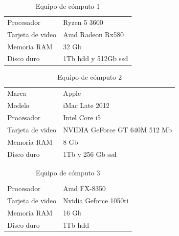 \documentclass[12pt, a4paper, titlepage]{report}
\begin{document}
        \begin{table}[H]
        	\caption[Equipo de cómputo 1]{Equipo de cómputo 1}
	    	\begin{tabular}{|p{3.5cm}||p{10cm}|}
	    		\rowcolor{guindapoli}
	    		\multicolumn{2}{|c|}{\textbf{\textcolor{white}{Equipo de cómputo 1 utilizado.}}}\\
	    		\hline
	    		\rowcolor{azulclaro}Procesador & Ryzen 5 3600\\
	    		\hline
	    		\rowcolor{white}Tarjeta de video & Amd Radeon Rx580\\
	    		\hline
	    		\rowcolor{azulclaro}Memoria RAM & 32 Gb\\
	    		\hline
	    		\rowcolor{white}Disco duro & 1Tb \acrshort{hdd} y 512Gb \acrshort{ssd}\\
	    		\hline
	    	\end{tabular}
   	  \end{table}
      \begin{table}[H]
      	\caption[Equipo de cómputo 2]{Equipo de cómputo 2}
	    	\begin{tabular}{|p{3.5cm}||p{10cm}|}
	    		\rowcolor{guindapoli}
	    		\multicolumn{2}{|c|}{\textbf{\textcolor{white}{Equipo de cómputo 2 utilizado.}}}\\
	    		\hline
	    		\rowcolor{azulclaro}Marca & Apple\\
	    		\hline
	    		\rowcolor{white}Modelo & iMac Late 2012\\
	    		\hline
	    		\rowcolor{azulclaro}Procesador & Intel Core i5\\
	    		\hline
	    		\rowcolor{white}Tarjeta de video & NVIDIA GeForce GT 640M 512 Mb\\
	    		\hline
	    		\rowcolor{azulclaro}Memoria RAM & 8 Gb\\
	    		\hline
	    		\rowcolor{white}Disco duro & 1Tb y 256 Gb \acrshort{ssd}\\
	    		\hline
	    	\end{tabular}
    \end{table}
    \begin{table}[H]
    	\caption[Equipo de cómputo 3]{Equipo de cómputo 3}
			\begin{tabular}{|p{3.5cm}||p{10cm}|}
				\rowcolor{guindapoli}
				\multicolumn{2}{|c|}{\textbf{\textcolor{white}{Equipo de cómputo 3 utilizado.}}}\\
				\hline
				\rowcolor{azulclaro}Procesador & Amd FX-8350\\
				\hline
				\rowcolor{white}Tarjeta de video & Nvidia Geforce 1050ti\\
				\hline
				\rowcolor{azulclaro}Memoria RAM & 16 Gb\\
				\hline
				\rowcolor{white}Disco duro & 1Tb \acrshort{hdd}\\
				\hline
			\end{tabular}
   \end{table}
\end{document}
